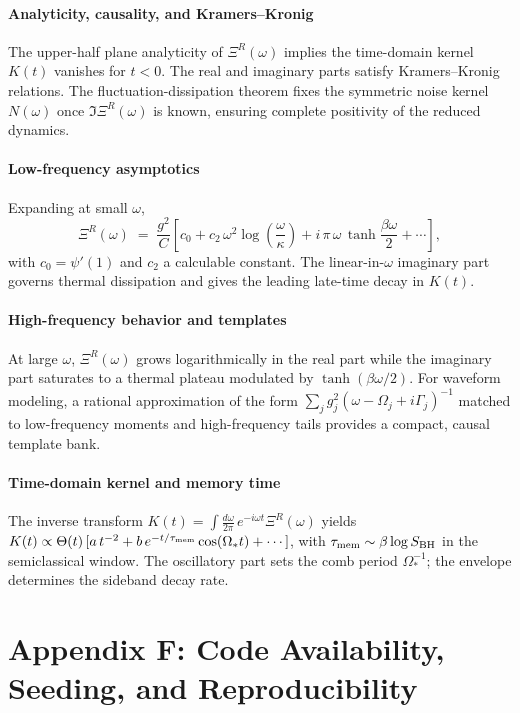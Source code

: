 \documentclass[a4paper,11pt]{article}
\theoremstyle{plain}
\theoremstyle{definition}
\theoremstyle{remark}
\begin{document}
\paragraph{Analyticity, causality, and Kramers--Kronig}
The upper-half plane analyticity of $\Xi^R(\omega)$ implies the time-domain kernel $K(t)$ vanishes for $t<0$. The real and imaginary parts satisfy Kramers--Kronig relations. The fluctuation-dissipation theorem fixes the symmetric noise kernel $N(\omega)$ once $\Im \Xi^R(\omega)$ is known, ensuring complete positivity of the reduced dynamics.

\paragraph{Low-frequency asymptotics}
Expanding at small $\omega$,
\begin{equation}
\Xi^R(\omega)\;=\;\frac{g^2}{C}\left[c_0 + c_2\,\omega^2\log\!\left(\frac{\omega}{\kappa}\right)+ i\,\pi\,\omega\,\tanh\!\frac{\beta\omega}{2}+\cdots\right],
\end{equation}
with $c_0=\psi'(1)$ and $c_2$ a calculable constant. The linear-in-$\omega$ imaginary part governs thermal dissipation and gives the leading late-time decay in $K(t)$.

\paragraph{High-frequency behavior and templates}
At large $\omega$, $\Xi^R(\omega)$ grows logarithmically in the real part while the imaginary part saturates to a thermal plateau modulated by $\tanh(\beta\omega/2)$. For waveform modeling, a rational approximation of the form $\sum_j g_j^2(\omega-\Omega_j+i\Gamma_j)^{-1}$ matched to low-frequency moments and high-frequency tails provides a compact, causal template bank.

\paragraph{Time-domain kernel and memory time}
The inverse transform $K(t)=\int \frac{d\omega}{2\pi}\,e^{-i\omega t}\Xi^R(\omega)$ yields $K(t)\propto \Theta(t)\,[a\,t^{-2}+b\,e^{-t/\tau_{\rm mem}}\cos(\Omega_\ast t)+\cdots]$, with $\tau_{\rm mem}\sim \beta\log S_{\rm BH}$ in the semiclassical window. The oscillatory part sets the comb period $\Omega_\ast^{-1}$; the envelope determines the sideband decay rate.

\section{Appendix F: Code Availability, Seeding, and Reproducibility}
\label{app:code}
\end{document}
